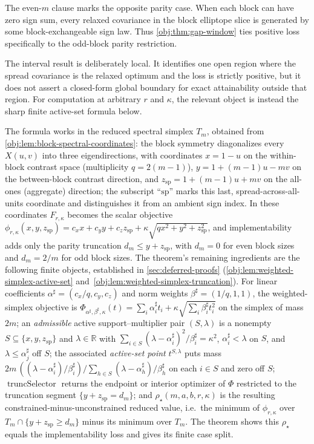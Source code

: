 \documentclass[11pt]{article}
\begin{document}
The even-\(m\) clause marks the opposite parity case. When each block can have zero sign sum, every relaxed covariance in the block elliptope slice is generated by some block-exchangeable sign law. Thus \cref{obj:thm:gap-window} ties positive loss specifically to the odd-block parity restriction.

The interval result is deliberately local. It identifies one open region where the spread covariance is the relaxed optimum and the loss is strictly positive, but it does not assert a closed-form global boundary for exact attainability outside that region. For computation at arbitrary \(r\) and \(\kappa\), the relevant object is instead the sharp finite active-set formula below.

The formula works in the reduced spectral simplex \(T_m\), obtained from \cref{obj:lem:block-spectral-coordinates}: the block symmetry diagonalizes every \(X(u,v)\) into three eigendirections, with coordinates \(x=1-u\) on the within-block contrast space (multiplicity \(q=2(m-1)\)), \(y=1+(m-1)u-mv\) on the between-block contrast direction, and \(z_{\mathrm{sp}}=1+(m-1)u+mv\) on the all-ones (aggregate) direction; the subscript ``\(\mathrm{sp}\)'' marks this last, spread-across-all-units coordinate and distinguishes it from an ambient sign index. In these coordinates \(F_{r,\kappa}\) becomes the scalar objective \(\phi_{r,\kappa}(x,y,z_{\mathrm{sp}})=c_xx+c_yy+c_zz_{\mathrm{sp}}+\kappa\sqrt{qx^2+y^2+z_{\mathrm{sp}}^2}\), and implementability adds only the parity truncation \(d_m\le y+z_{\mathrm{sp}}\), with \(d_m=0\) for even block sizes and \(d_m=2/m\) for odd block sizes. The theorem's remaining ingredients are the following finite objects, established in \cref{sec:deferred-proofs} (\cref{obj:lem:weighted-simplex-active-set} and~\cref{obj:lem:weighted-simplex-truncation}). For linear coefficients \(\alpha^\sharp=(c_x/q,c_y,c_z)\) and norm weights \(\beta^\sharp=(1/q,1,1)\), the weighted-simplex objective is \(\Phi_{\alpha^\sharp,\beta^\sharp,\kappa}(t)=\sum_i\alpha^\sharp_i t_i+\kappa\sqrt{\sum_i\beta^\sharp_i t_i^2}\) on the simplex of mass \(2m\); an \emph{admissible} active support–multiplier pair \((S,\lambda)\) is a nonempty \(S\subseteq\{x,y,z_{\mathrm{sp}}\}\) and \(\lambda\in\mathbb R\) with \(\sum_{i\in S}(\lambda-\alpha^\sharp_i)^2/\beta^\sharp_i=\kappa^2\), \(\alpha^\sharp_i<\lambda\) on \(S\), and \(\lambda\le\alpha^\sharp_j\) off \(S\); the associated \emph{active-set point} \(t^{S,\lambda}\) puts mass \(2m\,((\lambda-\alpha^\sharp_i)/\beta^\sharp_i)/\sum_{h\in S}(\lambda-\alpha^\sharp_h)/\beta^\sharp_h\) on each \(i\in S\) and zero off \(S\); \(\operatorname{truncSelector}\) returns the endpoint or interior optimizer of \(\Phi\) restricted to the truncation segment \(\{y+z_{\mathrm{sp}}=d_m\}\); and \(\rho_\star(m,a,b,r,\kappa)\) is the resulting constrained-minus-unconstrained reduced value, i.e.\ the minimum of \(\phi_{r,\kappa}\) over \(T_m\cap\{y+z_{\mathrm{sp}}\ge d_m\}\) minus its minimum over \(T_m\). The theorem shows this \(\rho_\star\) equals the implementability loss and gives its finite case split.
\end{document}
